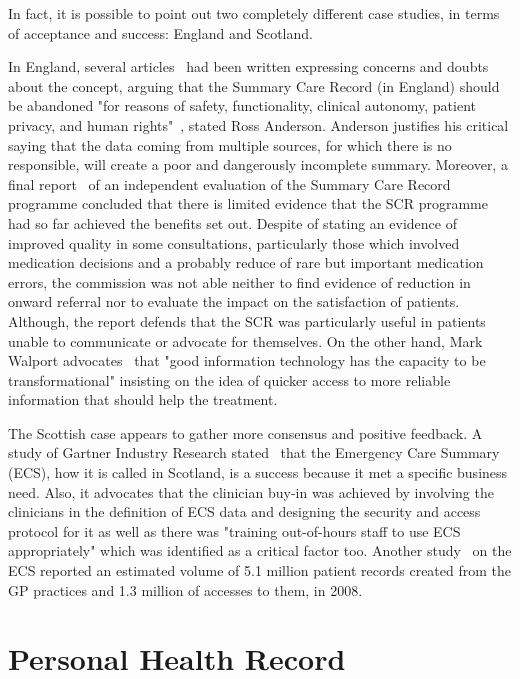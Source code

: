 In fact, it is possible to point out two completely different case studies, in terms of acceptance and success: England and Scotland. 

In England, several articles~\citep{Anderson2010, Coiera2011, Greenhalgh2010} had been written expressing concerns and doubts about the concept, arguing that the Summary Care Record (in England) should be abandoned "for reasons of safety, functionality, clinical autonomy, patient privacy, and human rights"~\citep{Anderson2010}, stated Ross Anderson. Anderson justifies his critical saying that the data coming from multiple sources, for which there is no responsible, will create a poor and dangerously incomplete summary. Moreover, a final report~\citep{Stramer2010} of an independent evaluation of the Summary Care Record programme concluded that there is limited evidence that the SCR programme had so far achieved the benefits set out. Despite of stating an evidence of improved quality in some consultations, particularly those which involved medication decisions and a probably reduce of rare but important medication errors, the commission was not able neither to find evidence of reduction in onward referral nor to evaluate the impact on the satisfaction of patients. Although, the report defends that the SCR was particularly useful in patients unable to communicate or advocate for themselves. On the other hand, Mark Walport advocates~\citep{Walport2010} that "good information technology has the capacity to be transformational" insisting on the idea of quicker access to more reliable information that should help the treatment.

The Scottish case appears to gather more consensus and positive feedback. A study of Gartner Industry Research stated~\citep{Research2007} that the Emergency Care Summary (ECS), how it is called in Scotland, is a success because it met a specific business need. Also, it advocates that the clinician buy-in was achieved by involving the clinicians in the definition of ECS data and designing the security and access protocol for it as well as there was "training out-of-hours staff to use ECS appropriately" which was identified as a critical factor too. Another study~\citep{Jones2008} on the ECS reported an estimated volume of 5.1 million patient records created from the GP practices and 1.3 million of accesses to them, in 2008.

\section{Personal Health Record}

